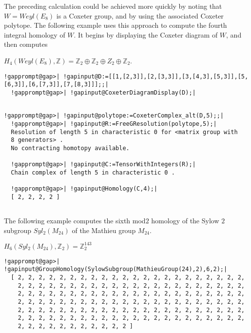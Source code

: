 \documentclass[a4paper,11pt]{report}
\begin{document}
{{{\begin{Verbatim}[commandchars=!@|,fontsize=\small,frame=single,label=Example]
\end{Verbatim}
 

The preceding calculation could be achieved more quickly by noting that $W=Weyl(E_8)$ is a Coxeter group, and by using the associated Coxeter polytope. The
following example uses this approach to compute the fourth integral homology
of $W$. It begins by displaying the Coxeter diagram of $W$, and then computes 

$H_4(Weyl(E_8),\mathbb Z) = \mathbb Z_2 \oplus \mathbb Z_2 \oplus Z_2 \oplus
\mathbb Z_2$. 
\begin{Verbatim}[commandchars=!@|,fontsize=\small,frame=single,label=Example]
  !gapprompt@gap>| !gapinput@D:=[[1,[2,3]],[2,[3,3]],[3,[4,3],[5,3]],[5,[6,3]],[6,[7,3]],[7,[8,3]]];;|
  !gapprompt@gap>| !gapinput@CoxeterDiagramDisplay(D);|
  
\end{Verbatim}
  
\begin{Verbatim}[commandchars=!@|,fontsize=\small,frame=single,label=Example]
  !gapprompt@gap>| !gapinput@polytope:=CoxeterComplex_alt(D,5);;|
  !gapprompt@gap>| !gapinput@R:=FreeGResolution(polytope,5);|
  Resolution of length 5 in characteristic 0 for <matrix group with 
  8 generators> . 
  No contracting homotopy available. 
  
  !gapprompt@gap>| !gapinput@C:=TensorWithIntegers(R);|
  Chain complex of length 5 in characteristic 0 . 
  
  !gapprompt@gap>| !gapinput@Homology(C,4);|
  [ 2, 2, 2, 2 ]
  
\end{Verbatim}
 

The following example computes the sixth mod\texttt{}$2$ homology of the Sylow $2$\texttt{}subgroup $Syl_2(M_{24})$ of the Mathieu group $M_{24}$. 

$H_6(Syl_2(M_{24}),\mathbb Z_2) = \mathbb Z_2^{143}$ 
\begin{Verbatim}[commandchars=!@|,fontsize=\small,frame=single,label=Example]
  !gapprompt@gap>| !gapinput@GroupHomology(SylowSubgroup(MathieuGroup(24),2),6,2);|
  [ 2, 2, 2, 2, 2, 2, 2, 2, 2, 2, 2, 2, 2, 2, 2, 2, 2, 2, 2, 2, 2, 2, 
    2, 2, 2, 2, 2, 2, 2, 2, 2, 2, 2, 2, 2, 2, 2, 2, 2, 2, 2, 2, 2, 2, 
    2, 2, 2, 2, 2, 2, 2, 2, 2, 2, 2, 2, 2, 2, 2, 2, 2, 2, 2, 2, 2, 2, 
    2, 2, 2, 2, 2, 2, 2, 2, 2, 2, 2, 2, 2, 2, 2, 2, 2, 2, 2, 2, 2, 2, 
    2, 2, 2, 2, 2, 2, 2, 2, 2, 2, 2, 2, 2, 2, 2, 2, 2, 2, 2, 2, 2, 2, 
    2, 2, 2, 2, 2, 2, 2, 2, 2, 2, 2, 2, 2, 2, 2, 2, 2, 2, 2, 2, 2, 2, 
    2, 2, 2, 2, 2, 2, 2, 2, 2, 2, 2 ]
  

\end{Verbatim}}}}
\end{document}
